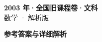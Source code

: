 \documentclass[zihao=-4, a4paper]{ctexart}
\begin{document}
\begin{center}
  {\Large\bfseries 2003 年·全国旧课程卷·文科}\\[4pt]
  {\large 数学 · 解析版}
\end{center}
\medskip
{}

\clearpage
{}
\begin{center}{\Large\bfseries 参考答案与详细解析}\end{center}
\medskip

\end{document}
